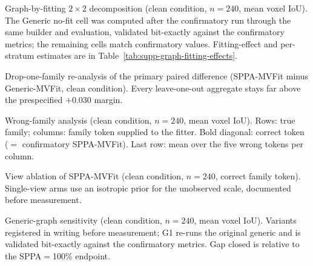 \documentclass[10pt]{article}
\begin{document}
\begin{table}[!htbp]
\centering
\scriptsize
\caption{Graph-by-fitting \(2\times2\) decomposition (clean condition, \(n{=}240\), mean voxel IoU). The Generic no-fit
cell was computed after the confirmatory run through the same builder and
evaluation, validated bit-exactly against the confirmatory metrics; the
remaining cells match confirmatory values. Fitting-effect and per-stratum
estimates are in Table~\ref{tab:supp-graph-fitting-effects}.}
\label{tab:graph-x-fitting}

\end{table}

\begin{table}[!htbp]
\centering
\scriptsize
\caption{Drop-one-family re-analysis of the primary
paired difference (SPPA-MVFit minus Generic-MVFit, clean condition). Every
leave-one-out aggregate stays far above the prespecified \(+0.030\) margin.}
\label{tab:drop-one-family}

\end{table}

\begin{table}[!htbp]
\centering
\scriptsize
\setlength{\tabcolsep}{3pt}
\caption{Wrong-family analysis (clean condition,
\(n{=}240\), mean voxel IoU). Rows: true family; columns: family token
supplied to the fitter. Bold diagonal: correct token (\(=\) confirmatory
SPPA-MVFit). Last row: mean over the five wrong tokens per column.}
\label{tab:wrong-family-matrix}

\end{table}

\begin{table}[!htbp]
\centering
\scriptsize
\caption{View ablation of SPPA-MVFit (clean condition,
\(n{=}240\), correct family token). Single-view arms use an isotropic prior
for the unobserved scale, documented before measurement.}
\label{tab:view-ablation}

\end{table}

\begin{table}[!htbp]
\centering
\scriptsize
\caption{Generic-graph sensitivity (clean condition,
\(n{=}240\), mean voxel IoU). Variants registered in writing before
measurement; G1 re-runs the original generic and is validated bit-exactly
against the confirmatory metrics. Gap closed is relative to the
SPPA\(=\)100\% endpoint.}
\label{tab:generic-graph-sensitivity}

\end{table}
\end{document}
